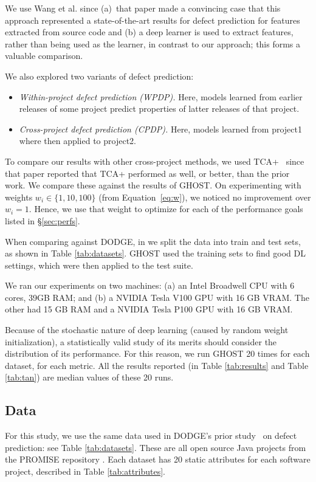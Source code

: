 \documentclass[10pt,compsoc,twocolumn]{IEEEtran}
\newcommand{\bi}{\begin{itemize}}
\newcommand{\ei}{\end{itemize}}
\begin{document}
We    use Wang et al. since (a)~that paper made a convincing case that this approach represented a  state-of-the-art results for defect prediction for
 features extracted from source code and  (b) a deep learner is used to extract features, rather than being used as the learner, in contrast to our approach; this forms a valuable comparison.


We also explored two variants of defect prediction:
\bi
\item 
{\em Within-project defect prediction (WPDP).} Here, models
learned from earlier releases of some project  predict properties
of latter releases of that project.
\item
{\em Cross-project defect prediction (CPDP).} Here, models learned
from project1 where then applied to project2. 
\ei
To compare our results
with other cross-project methods, we used TCA+~\cite{liu2019two} since
that paper reported that TCA+ performed as well, or better, than the prior work.
We compare these against the results of GHOST. On experimenting with weights $w_i\in\{1, 10,  100\}$ (from Equation~\ref{eq:w}), we noticed no improvement over $w_i=1$. Hence, we use that weight to optimize for   each of the  performance goals
listed in \S\ref{sec:perfs}.

When comparing against DODGE, in  we split the data into train and test sets, as shown in Table \ref{tab:datasets}.  GHOST used the training sets to find good DL settings, which were then applied to the test suite.


We ran our experiments on two machines:
(a) an Intel Broadwell CPU with 6 cores, 39GB RAM; and (b) a NVIDIA Tesla V100 GPU with 16 GB VRAM. The other had 15 GB RAM and a NVIDIA Tesla P100 GPU with 16 GB VRAM.

Because of the stochastic nature of deep learning (caused by random weight initialization), a statistically valid study of its merits should consider the distribution of its performance. For this reason, we run GHOST 20 times for each dataset, for each metric. All the results reported (in Table \ref{tab:results} and Table \ref{tab:tan}) are median values of these 20 runs.

\subsection{Data}
For this study, we use the same data used in DODGE's prior study~\cite{agrawal2019dodge} on defect prediction: see Table \ref{tab:datasets}. These are all open source Java projects from  the PROMISE repository \cite{Sayyad-Shirabad+Menzies:2005}.  Each dataset has 20 static attributes for each software project, described in Table \ref{tab:attributes}.
\end{document}
